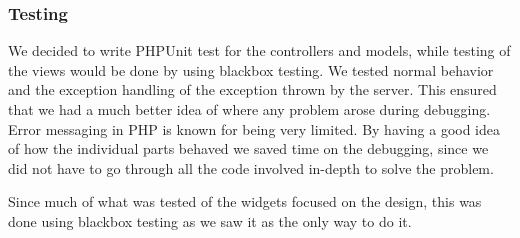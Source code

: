 \subsubsection{Testing}
We decided to write PHPUnit test for the controllers and models, while testing of the views would be done by using blackbox testing. We tested normal behavior and the exception handling of the exception thrown by the server. This ensured that we had a much better idea of where any problem arose during debugging. Error messaging in PHP is known for being very limited. By having a good idea of how the individual parts behaved we saved time on the debugging, since we did not have to go through all the code involved in-depth to solve the problem. 

Since much of what was tested of the widgets focused on the design, this was done using blackbox testing as we saw it as the only way to do it.

